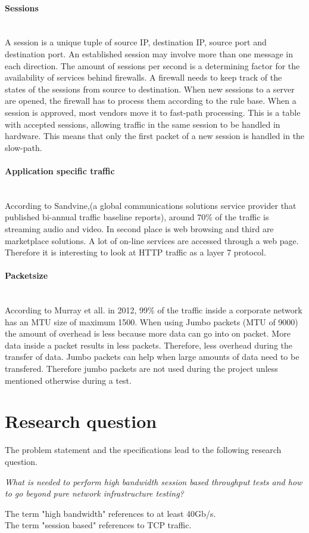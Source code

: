 \paragraph{Sessions}\label{par:sessions}\mbox{}\\
A session is a unique tuple of source IP, destination IP, source port and destination port. An established session may involve more than one message in each direction.
The amount of sessions per second is a determining factor for the availability of services behind firewalls. A firewall needs to keep track of the states of the sessions from source to destination. 
When new sessions to a server are opened, the firewall has to process them according to the rule base. When a session is approved, most vendors move it to fast-path processing. 
This is a table with accepted sessions, allowing traffic in the same session to be handled in hardware. This means that only the first packet of a new session is handled in the slow-path.

\paragraph{Application specific traffic}\mbox{} \\
According to Sandvine,(a global communications solutions service provider that published bi-annual traffic baseline reports), around 70\% of the traffic is streaming audio and video. In second place is web browsing and third are marketplace solutions. A lot of on-line services are accessed through a web page. 
Therefore it is interesting to look at HTTP traffic as a layer 7 protocol.

\paragraph{Packetsize}\label{par:packetsize}\mbox{}\\
According to Murray et all. \cite{murray2012state}  in 2012, 99\% of the traffic inside a corporate network has an MTU size of maximum 1500. When using Jumbo packets (MTU of 9000) the amount of overhead is less because more data can go into on packet. More data inside a packet results in less packets. Therefore, less overhead during the transfer of data. 
Jumbo packets can help when large amounts of data need to be transfered.  
Therefore jumbo packets are not used during the project unless mentioned otherwise during a test.

\section{Research question}\label{sec:researchquestion}
The problem statement and the specifications lead to the following research question.

\begin{center}
\textit{What is needed to perform high bandwidth session based throughput tests and how to go beyond pure network infrastructure testing?} \\
\end{center}
The term "high bandwidth" references to at least 40Gb/s. \\
The term "session based" references to TCP traffic. \\

